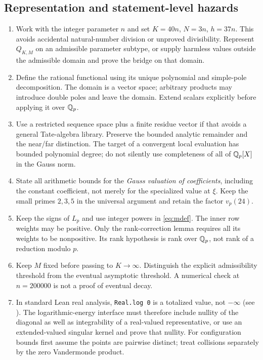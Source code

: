 \subsection{Representation and statement-level hazards}
\begin{enumerate}[leftmargin=*,label=\arabic*.]
\item Work with the integer parameter $n$ and set $K=40n$, $N=3n$,
$h=37n$. This avoids accidental natural-number division or unproved
divisibility. Represent $Q_{K,M}$ on an admissible parameter subtype, or
supply harmless values outside the admissible domain and prove the
bridge on that domain.
\item Define the rational functional using its unique polynomial and
simple-pole decomposition. The domain is a vector space; arbitrary
products may introduce double poles and leave the domain. Extend
scalars explicitly before applying it over $\mathbb Q_p$.
\item Use a restricted sequence space plus a finite residue vector if
that avoids a general Tate-algebra library. Preserve the bounded
analytic remainder and the near/far distinction. The target of a
convergent local evaluation has bounded polynomial degree; do not
silently use completeness of all of $\mathbb Q_p[X]$ in the Gauss norm.
\item State all arithmetic bounds for the \emph{Gauss valuation of
coefficients}, including the constant coefficient, not merely for the
specialized value at $\xi$. Keep the small primes $2,3,5$ in the
universal argument and retain the factor $v_p(24)$.
\item Keep the signs of $L_p$ and use integer powers in \eqref{eq:mdef}.
The inner row weights may be positive. Only the rank-correction lemma
requires all its weights to be nonpositive. Its rank hypothesis is rank
over $\mathbb Q_p$, not rank of a reduction modulo $p$.
\item Keep $M$ fixed before passing to $K\to\infty$. Distinguish the
explicit admissibility threshold from the eventual asymptotic threshold.
A numerical check at $n=200000$ is not a proof of eventual decay.
\item In standard Lean real analysis, \texttt{Real.log 0} is a totalized
value, not $-\infty$ (see \cite{MathlibLog}). The logarithmic-energy interface must therefore
include nullity of the diagonal as well as integrability of a real-valued
representative, or use an extended-valued singular kernel and prove that
nullity. For configuration bounds first assume the points are pairwise
distinct; treat collisions separately by the zero Vandermonde product.

\end{enumerate}
